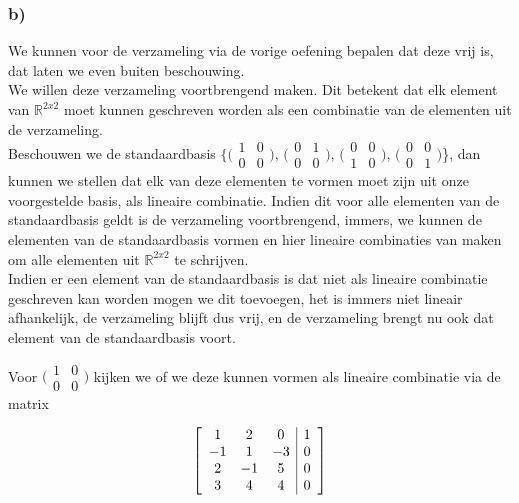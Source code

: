 \documentclass[lineaire_algebra_oplossingen.tex]{subfiles}
\begin{document}
\subsubsection*{b)}

We kunnen voor de verzameling via de vorige oefening bepalen dat deze vrij is, dat laten we even buiten beschouwing.\\

We willen deze verzameling voortbrengend maken. Dit betekent dat elk element van $\mathbb{R}^{2x2}$ moet kunnen geschreven worden als een combinatie van de elementen uit de verzameling.\\

Beschouwen we de standaardbasis $\{\bigl(
\begin{smallmatrix}
1&0\\ 0&0
\end{smallmatrix}
\bigr)$,
$\bigl(
\begin{smallmatrix}
0&1\\ 0&0
\end{smallmatrix}
\bigr)$,
$\bigl(
\begin{smallmatrix}
0&0\\ 1&0
\end{smallmatrix}
\bigr)$,
$\bigl(
\begin{smallmatrix}
0&0\\ 0&1
\end{smallmatrix}
\bigr)$\}, dan kunnen we stellen dat elk van deze elementen te vormen moet zijn uit onze voorgestelde basis, als lineaire combinatie. Indien dit voor alle elementen van de standaardbasis geldt is de verzameling voortbrengend, immers, we kunnen de elementen van de standaardbasis vormen en hier lineaire combinaties van maken om alle elementen uit $\mathbb{R}^{2x2}$ te schrijven.\\

Indien er een element van de standaardbasis is dat niet als lineaire combinatie geschreven kan worden mogen we dit toevoegen, het is immers niet lineair afhankelijk, de verzameling blijft dus vrij, en de verzameling brengt nu ook dat element van de standaardbasis voort.

Voor $\bigl(
\begin{smallmatrix}
1&0\\ 0&0
\end{smallmatrix}
\bigr)$ kijken we of we deze kunnen vormen als lineaire combinatie via de matrix

\[
\left[
\begin{array}{c c c | c}
1 & 2 & 0 & 1\\
-1 & 1 & -3 & 0\\
2 & -1 & 5 & 0\\
3 & 4 & 4 & 0
\end{array}
\right]
\]
\end{document}
